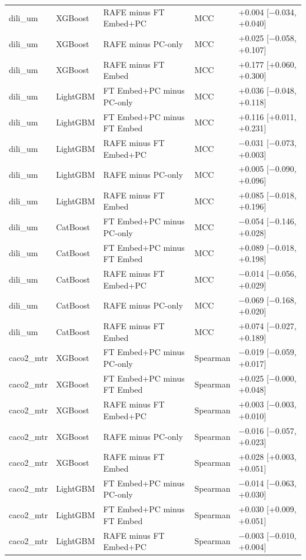 \begin{longtable}{llllp{4.2cm}}
dili\_um & XGBoost & RAFE minus FT Embed+PC & MCC & +0.004 [$-$0.034, +0.040] \\
dili\_um & XGBoost & RAFE minus PC-only & MCC & +0.025 [$-$0.058, +0.107] \\
dili\_um & XGBoost & RAFE minus FT Embed & MCC & +0.177 [+0.060, +0.300] \\
dili\_um & LightGBM & FT Embed+PC minus PC-only & MCC & +0.036 [$-$0.048, +0.118] \\
dili\_um & LightGBM & FT Embed+PC minus FT Embed & MCC & +0.116 [+0.011, +0.231] \\
dili\_um & LightGBM & RAFE minus FT Embed+PC & MCC & $-$0.031 [$-$0.073, +0.003] \\
dili\_um & LightGBM & RAFE minus PC-only & MCC & +0.005 [$-$0.090, +0.096] \\
dili\_um & LightGBM & RAFE minus FT Embed & MCC & +0.085 [$-$0.018, +0.196] \\
dili\_um & CatBoost & FT Embed+PC minus PC-only & MCC & $-$0.054 [$-$0.146, +0.028] \\
dili\_um & CatBoost & FT Embed+PC minus FT Embed & MCC & +0.089 [$-$0.018, +0.198] \\
dili\_um & CatBoost & RAFE minus FT Embed+PC & MCC & $-$0.014 [$-$0.056, +0.029] \\
dili\_um & CatBoost & RAFE minus PC-only & MCC & $-$0.069 [$-$0.168, +0.020] \\
dili\_um & CatBoost & RAFE minus FT Embed & MCC & +0.074 [$-$0.027, +0.189] \\
caco2\_mtr & XGBoost & FT Embed+PC minus PC-only & Spearman & $-$0.019 [$-$0.059, +0.017] \\
caco2\_mtr & XGBoost & FT Embed+PC minus FT Embed & Spearman & +0.025 [$-$0.000, +0.048] \\
caco2\_mtr & XGBoost & RAFE minus FT Embed+PC & Spearman & +0.003 [$-$0.003, +0.010] \\
caco2\_mtr & XGBoost & RAFE minus PC-only & Spearman & $-$0.016 [$-$0.057, +0.023] \\
caco2\_mtr & XGBoost & RAFE minus FT Embed & Spearman & +0.028 [+0.003, +0.051] \\
caco2\_mtr & LightGBM & FT Embed+PC minus PC-only & Spearman & $-$0.014 [$-$0.063, +0.030] \\
caco2\_mtr & LightGBM & FT Embed+PC minus FT Embed & Spearman & +0.030 [+0.009, +0.051] \\
caco2\_mtr & LightGBM & RAFE minus FT Embed+PC & Spearman & $-$0.003 [$-$0.010, +0.004] \\

\end{longtable}
